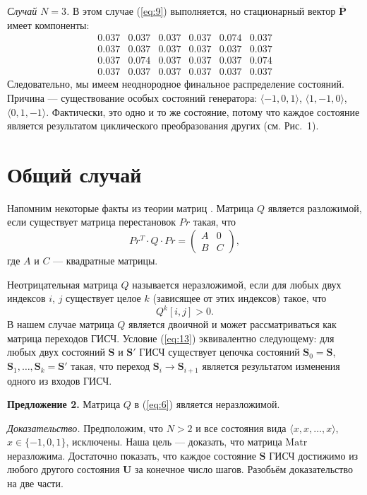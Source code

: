 \documentclass[a4paper,12pt]{article}
\begin{document}
\textit{Случай $N=3$.} В этом случае (\ref{eq:9}) выполняется, но стационарный вектор $\overline{\mathbf{P}}$ имеет компоненты:
\[
\begin{array}{cccccc}
0.037 & 0.037 & 0.037 & 0.037 & 0.074 & 0.037 \\
0.037 & 0.037 & 0.037 & 0.037 & 0.037 & 0.037 \\
0.037 & 0.074 & 0.037 & 0.037 & 0.037 & 0.074 \\
0.037 & 0.037 & 0.037 & 0.037 & 0.037 & 0.037
\end{array}
\]
Следовательно, мы имеем неоднородное финальное распределение состояний. Причина --- существование особых состояний генератора: $\langle -1,0,1\rangle$, $\langle 1,-1,0\rangle$, $\langle 0,1,-1\rangle$. Фактически, это одно и то же состояние, потому что каждое состояние является результатом циклического преобразования других (см. Рис.~1).

\section{Общий случай}

Напомним некоторые факты из теории матриц \cite{marcus1964}. Матрица $Q$ является разложимой, если существует матрица перестановок $Pr$ такая, что
\[
Pr^T \cdot Q \cdot Pr = 
\begin{pmatrix}
A & 0 \\
B & C
\end{pmatrix},
\]
где $A$ и $C$ — квадратные матрицы.

Неотрицательная матрица $Q$ называется неразложимой, если для любых двух индексов $i$, $j$ существует целое $k$ (зависящее от этих индексов) такое, что
\begin{equation}
Q^k[i,j] > 0.
\label{eq:13}
\end{equation}
В нашем случае матрица $Q$ является двоичной и может рассматриваться как матрица переходов ГИСЧ. Условие (\ref{eq:13}) эквивалентно следующему: для любых двух состояний $\mathbf{S}$ и $\mathbf{S}'$ ГИСЧ существует цепочка состояний $\mathbf{S}_0 = \mathbf{S}$, $\mathbf{S}_1, \ldots, \mathbf{S}_k = \mathbf{S}'$ такая, что переход $\mathbf{S}_i \to \mathbf{S}_{i+1}$ является результатом изменения одного из входов ГИСЧ.

\textbf{Предложение 2.} Матрица $Q$ в (\ref{eq:6}) является неразложимой.

\textit{Доказательство.} Предположим, что $N>2$ и все состояния вида $\langle x,x,\ldots,x\rangle$, $x\in\{-1,0,1\}$, исключены. Наша цель — доказать, что матрица $\mathrm{Matr}$ неразложима. Достаточно показать, что каждое состояние $\mathbf{S}$ ГИСЧ достижимо из любого другого состояния $\mathbf{U}$ за конечное число шагов. Разобьём доказательство на две части.
\end{document}
